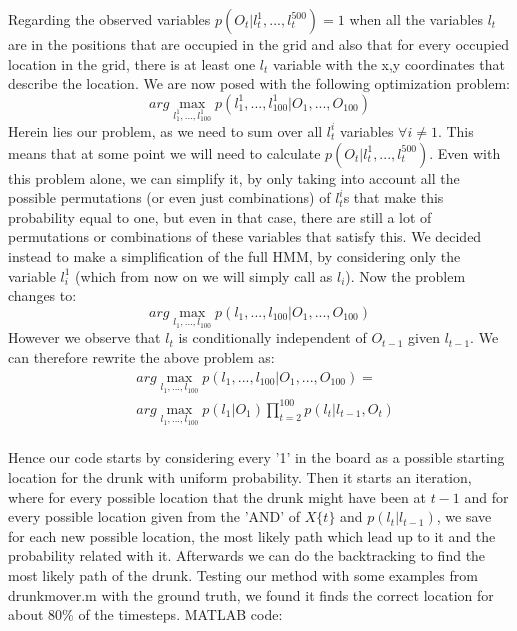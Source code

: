 \documentclass[11pt,a4paper,oneside]{report}
\begin{document}
Regarding the observed variables $p(O_t|l_t^1,...,l_t^{500})=1$ when all the variables $l_t$ are in the positions that are occupied in the grid and also that for every occupied location in the grid, there is at least one $l_t$ variable with the x,y coordinates that describe the location. We are now posed with the following optimization problem:
$$arg\max_{l_1^1,...,l_{100}^1}p(l_1^1,...,l_{100}^1 | O_1,...,O_{100})$$
Herein lies our problem, as we need to sum over all $l_t^i$ variables $\forall i \neq 1$. This means that at some point we will need to calculate $p(O_t|l_t^1,...,l_t^{500})$. Even with this problem alone, we can simplify it, by only taking into account all the possible permutations (or even just combinations) of $l_t^i$s that make this probability equal to one, but even in that case, there are still a lot of permutations or combinations of these variables that satisfy this. We decided instead to make a simplification of the full HMM, by considering only the variable $l_i^1$ (which from now on we will simply call as $l_i$). Now the problem changes to:
$$arg\max_{l_1,...,l_{100}}p(l_1,...,l_{100} | O_1,...,O_{100})$$
However we observe that $l_t$ is conditionally independent of $O_{t-1}$ given $l_{t-1}$. We can therefore rewrite the above problem as:
\begin{align*}
&arg\max_{l_1,...,l_{100}}p(l_1,...,l_{100} | O_1,...,O_{100})=\\
&arg\max_{l_1,...,l_{100}}p(l_1|O_1)\prod_{t=2}^{100}p(l_t|l_{t-1},O_t)\\
\end{align*}

Hence our code starts by considering every '1' in the board as a possible starting location for the drunk with uniform probability. Then it starts an iteration, where for every possible location that the drunk might have been at $t-1$ and for every possible location given from the 'AND' of $X\{t\}$ and $p(l_t|l_{t-1})$, we save for each new possible location, the most likely path which lead up to it and the probability related with it. Afterwards we can do the backtracking to find the most likely path of the drunk. Testing our method with some examples from drunkmover.m with the ground truth, we found it finds the correct location for about 80\% of the timesteps. MATLAB code:\\
\end{document}
